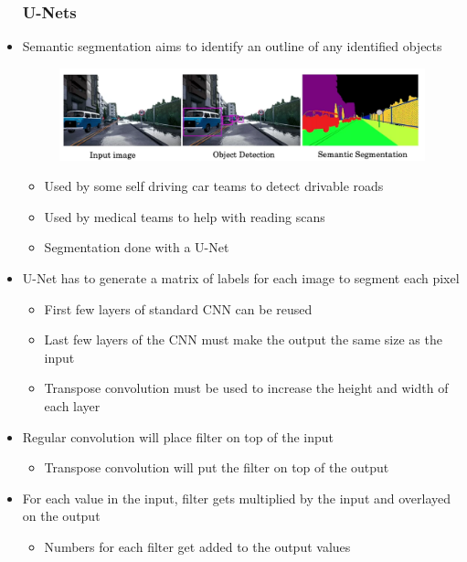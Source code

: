 \documentclass[12pt, letterpaper]{article}
\begin{document}
\begin{itemize}
        \subsubsection{U-Nets}
        \item Semantic segmentation aims to identify an outline of any identified objects
        \begin{figure}[ht]
            \centering
            \includegraphics[width=16cm]{30.png}
        \end{figure}
        \begin{itemize}
            \item Used by some self driving car teams to detect drivable roads
            \item Used by medical teams to help with reading scans
            \item Segmentation done with a U-Net
        \end{itemize}
        \item U-Net has to generate a matrix of labels for each image to segment each pixel
        \begin{itemize}
            \item First few layers of standard CNN can be reused
            \item Last few layers of the CNN must make the output the same size as the input
            \item Transpose convolution must be used to increase the height and width of each layer
        \end{itemize}
        \item Regular convolution will place filter on top of the input
        \begin{itemize}
            \item Transpose convolution will put the filter on top of the output
        \end{itemize}
        \item For each value in the input, filter gets multiplied by the input and overlayed on the output
        \begin{itemize} 
            \item Numbers for each filter get added to the output values

\end{itemize}
\end{itemize}
\end{document}
